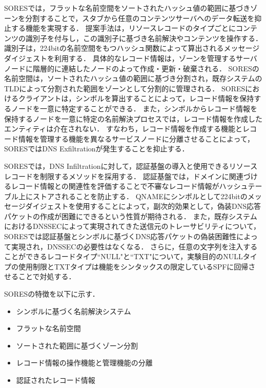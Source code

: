 SORESでは，フラットな名前空間をソートされたハッシュ値の範囲に基づきゾーンを分割することで，スタブから任意のコンテンツサーバへのデータ転送を抑止する機能を実現する．
提案手法は，リソースレコードのタイプごとにコンテンツの識別子を付与し，この識別子に基づき名前解決やコンテンツを操作する．
識別子は，224bitの名前空間をもつハッシュ関数によって算出されるメッセージダイジェストを利用する．
具体的なレコード情報は，ゾーンを管理するサーバノードに階層的に連結したノードのよって作成・更新・破棄される．
SORESの名前空間は，ソートされたハッシュ値の範囲に基づき分割され，既存システムのTLDによって分割された範囲をゾーンとして分割的に管理される．
SORESにおけるクライアントは，シンボルを算出することによって，レコード情報を保持するノードを一意に特定することができる．
また，シンボルからレコード情報を保持するノードを一意に特定の名前解決プロセスでは，レコード情報を作成したエンティティは介在されない．
すなわち，レコード情報を作成する機能とレコード情報を管理する機能を異なるサービスノードに分離させることによって，SORESではDNS Exfiltrationが発生することを抑止する．

SORESでは，DNS Infiltrationに対して，認証基盤の導入と使用できるリソースレコードを制限するメソッドを採用する．
認証基盤では，ドメインに関連づけるレコード情報との関連性を評価することで不審なレコード情報がハッシュテーブル上にストアされることを防止する．
QNAMEにシンボルとして224bitのメッセージダイジェストを使用することによって，副次的効果として，偽装DNS応答パケットの作成が困難にできるという性質が期待される．
また，既存システムにおけるDNSSECによって実現されてきた送信元のトレーサビリティについて，SORESでは認証基盤とシンボルに基づくDNS応答パケットの偽装困難性によって実現され，DNSSECの必要性はなくなる．
さらに，任意の文字列を注入することができるレコードタイプ``NULL"と``TXT"について，実験目的のNULLタイプの使用制限とTXTタイプは機能をシンタックスの限定しているSPFに回帰させることで対処する．

SORESの特徴を以下に示す．
\begin{itemize}
 \item シンボルに基づく名前解決システム
 \vspace{-3mm}
 \item フラットな名前空間
 \vspace{-3mm}
 \item ソートされた範囲に基づくゾーン分割
 \vspace{-3mm}
 \item レコード情報の操作機能と管理機能の分離
 \vspace{-3mm}
 \item 認証されたレコード情報
\end{itemize}


